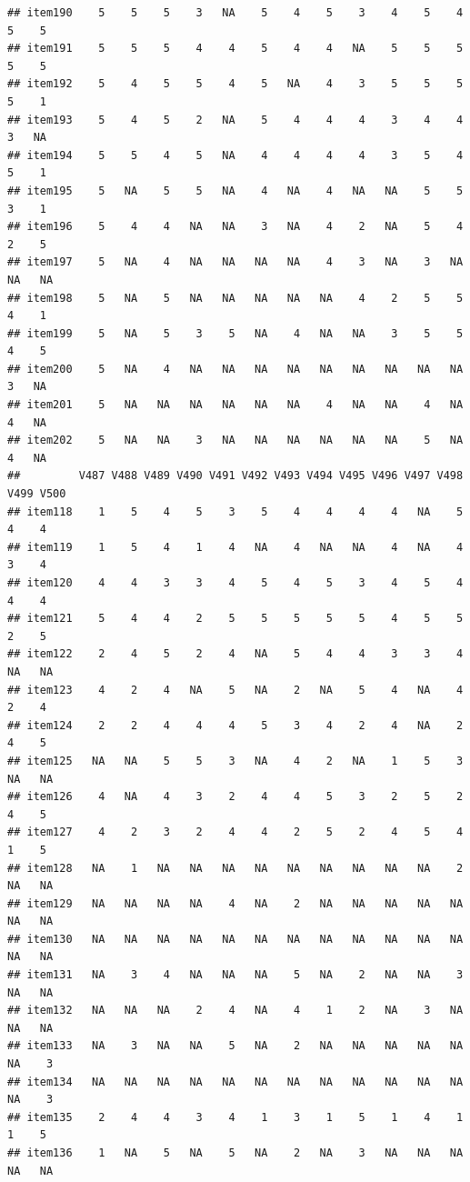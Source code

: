 \documentclass[
  man]{apa6}
\begin{document}
\begin{verbatim}
## item190    5    5    5    3   NA    5    4    5    3    4    5    4    5    5
## item191    5    5    5    4    4    5    4    4   NA    5    5    5    5    5
## item192    5    4    5    5    4    5   NA    4    3    5    5    5    5    1
## item193    5    4    5    2   NA    5    4    4    4    3    4    4    3   NA
## item194    5    5    4    5   NA    4    4    4    4    3    5    4    5    1
## item195    5   NA    5    5   NA    4   NA    4   NA   NA    5    5    3    1
## item196    5    4    4   NA   NA    3   NA    4    2   NA    5    4    2    5
## item197    5   NA    4   NA   NA   NA   NA    4    3   NA    3   NA   NA   NA
## item198    5   NA    5   NA   NA   NA   NA   NA    4    2    5    5    4    1
## item199    5   NA    5    3    5   NA    4   NA   NA    3    5    5    4    5
## item200    5   NA    4   NA   NA   NA   NA   NA   NA   NA   NA   NA    3   NA
## item201    5   NA   NA   NA   NA   NA   NA    4   NA   NA    4   NA    4   NA
## item202    5   NA   NA    3   NA   NA   NA   NA   NA   NA    5   NA    4   NA
##         V487 V488 V489 V490 V491 V492 V493 V494 V495 V496 V497 V498 V499 V500
## item118    1    5    4    5    3    5    4    4    4    4   NA    5    4    4
## item119    1    5    4    1    4   NA    4   NA   NA    4   NA    4    3    4
## item120    4    4    3    3    4    5    4    5    3    4    5    4    4    4
## item121    5    4    4    2    5    5    5    5    5    4    5    5    2    5
## item122    2    4    5    2    4   NA    5    4    4    3    3    4   NA   NA
## item123    4    2    4   NA    5   NA    2   NA    5    4   NA    4    2    4
## item124    2    2    4    4    4    5    3    4    2    4   NA    2    4    5
## item125   NA   NA    5    5    3   NA    4    2   NA    1    5    3   NA   NA
## item126    4   NA    4    3    2    4    4    5    3    2    5    2    4    5
## item127    4    2    3    2    4    4    2    5    2    4    5    4    1    5
## item128   NA    1   NA   NA   NA   NA   NA   NA   NA   NA   NA    2   NA   NA
## item129   NA   NA   NA   NA    4   NA    2   NA   NA   NA   NA   NA   NA   NA
## item130   NA   NA   NA   NA   NA   NA   NA   NA   NA   NA   NA   NA   NA   NA
## item131   NA    3    4   NA   NA   NA    5   NA    2   NA   NA    3   NA   NA
## item132   NA   NA   NA    2    4   NA    4    1    2   NA    3   NA   NA   NA
## item133   NA    3   NA   NA    5   NA    2   NA   NA   NA   NA   NA   NA    3
## item134   NA   NA   NA   NA   NA   NA   NA   NA   NA   NA   NA   NA   NA    3
## item135    2    4    4    3    4    1    3    1    5    1    4    1    1    5
## item136    1   NA    5   NA    5   NA    2   NA    3   NA   NA   NA   NA   NA

\end{verbatim}
\end{document}
